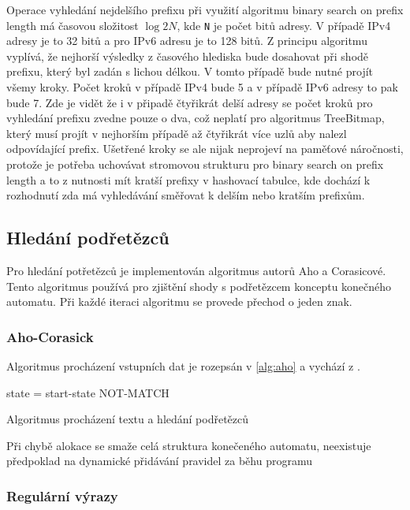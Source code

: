 Operace vyhledání nejdelšího prefixu při využití algoritmu binary search on prefix length má časovou
složitost $\log{2}{N}$, kde \texttt{N} je počet bitů adresy. V případě IPv4 adresy je to 32 bitů a pro IPv6
adresu je to 128 bitů. Z principu algoritmu vyplívá, že nejhorší výsledky z časového hlediska bude dosahovat
při shodě prefixu, který byl zadán s lichou délkou. V tomto případě bude nutné projít všemy kroky.
Počet kroků v případě IPv4 bude 5 a v případě IPv6 adresy to pak bude 7.
Zde je vidět že i v připadě čtyřikrát delší adresy se počet kroků pro vyhledání prefixu zvedne pouze o dva,
což neplatí pro algoritmus TreeBitmap, který musí projít v nejhorším případě až čtyřikrát více
uzlů aby nalezl odpovídající prefix. Ušetřené kroky se ale nijak neprojeví na paměťové náročnosti,
protože je potřeba uchovávat stromovou strukturu pro binary search on prefix length a to z nutnosti
mít kratší prefixy v hashovací tabulce, kde dochází k rozhodnutí zda má vyhledávání směřovat k delším nebo kratším prefixům.
\cite{bspl}


\subsection{Hledání podřetězců}
Pro hledání potřetězců je implementován algoritmus autorů Aho a Corasicové. Tento algoritmus používá pro zjištění shody s podřetězcem konceptu konečného automatu. Při každé iteraci algoritmu se provede přechod o jeden znak.

\subsubsection{Aho-Corasick}
Algoritmus procházení vstupních dat je rozepsán v \ref{alg:aho} a vychází z \cite{aho}.

\begin{algorithm}
	state = start-state\;
	{
	}
	\Return NOT-MATCH\;
	\caption{Algoritmus procházení textu a hledání podřetězců}
\end{algorithm}\label{alg:aho}

Při chybě alokace se smaže celá struktura konečeného automatu, neexistuje předpoklad na dynamické přidávání pravidel za běhu programu

\subsubsection{Regulární výrazy}

